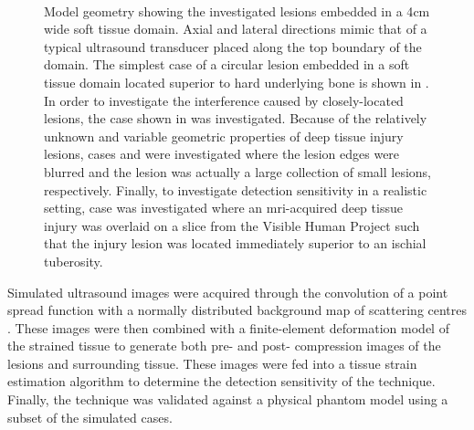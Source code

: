 		\begin{figure}[!t]
			\centering
			\subfloat[]{
				
				\label{fig:schematic_single}
			}
			~
			\subfloat[]{
				
				\label{fig:schematic_colocated}
			}
			~
			\subfloat[]{
				
				\label{fig:schematic_blur}
			}
			~
			\subfloat[]{
				
				\label{fig:schematic_blob}
			}
			~
			\subfloat[]{
				
				\label{fig:schematic_human}
			}
			\caption[Investigated model geometries]{Model geometry showing the investigated lesions embedded in a \unit{4}{cm} wide soft tissue domain. Axial and lateral directions mimic that of a typical ultrasound transducer placed along the top boundary of the domain. The simplest case of a circular lesion embedded in a soft tissue domain located superior to hard underlying bone is shown in \protect{}. In order to investigate the interference caused by closely-located lesions, the case shown in \protect{} was investigated. Because of the relatively unknown and variable geometric properties of deep tissue injury lesions, cases \protect{} and \protect{} were investigated where the lesion edges were blurred and the lesion was actually a large collection of small lesions, respectively. Finally, to investigate detection sensitivity in a realistic setting, case \protect{} was investigated where an mri-acquired deep tissue injury was overlaid on a slice from the Visible Human Project such that the injury lesion was located immediately superior to an ischial tuberosity.}	
			\label{fig:geometry}
		\end{figure}

		Simulated ultrasound images were acquired through the convolution of a point spread function with a normally distributed background map of scattering centres \cite{bamber80}. These images were then combined with a finite-element deformation model of the strained tissue to generate both pre- and post- compression images of the lesions and surrounding tissue. These images were fed into a tissue strain estimation algorithm to determine the detection sensitivity of the technique. Finally, the technique was validated against a physical phantom model using a subset of the simulated cases.

